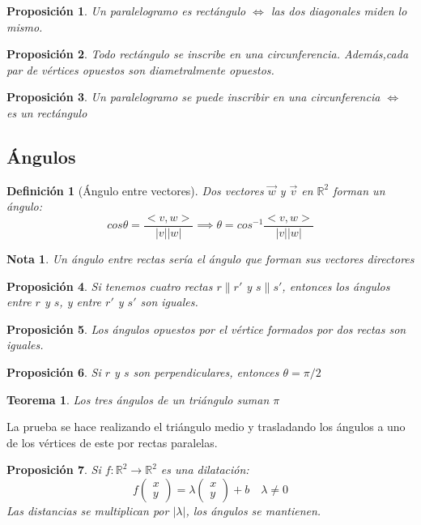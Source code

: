 \documentclass[11pt, a4paper, titlepage]{article}
\makeatletter
\renewenvironment{proof}[1][\proofname] {\vspace{-15pt}\par\pushQED{\qed}\normalfont\topsep6\p@\@plus6\p@\relax\trivlist\item[\hskip\labelsep\it#1\@addpunct{.}]\ignorespaces}{\popQED\endtrivlist\@endpefalse}
\newcommand{\R}{\mathbb{R}}
\theoremstyle{theorem-style}
\newtheorem*{nth}{Teorema}
\newtheorem*{nprop}{Proposición}
\theoremstyle{definition-style}
\newtheorem*{ndef}{Definición}
\theoremstyle{remark-style}
\newtheorem*{nota}{Nota}
\theoremstyle{example-style}
\makeatother
\begin{document}
\begin{nprop}
	Un paralelogramo es rectángulo $\iff$ las dos diagonales miden lo mismo.
\end{nprop}

\begin{nprop}
	Todo rectángulo se inscribe en una circunferencia. Además,cada par de vértices opuestos son diametralmente opuestos.
\end{nprop}

\begin{nprop}
	Un paralelogramo se puede inscribir en una circunferencia $\iff$ es un rectángulo
\end{nprop}

\subsection{Ángulos}

\begin{ndef}[Ángulo entre vectores]
	Dos vectores $\vec{w}$ y $\vec{v}$ en $\R^2$ forman un ángulo:
	\[
	cos \theta =  \frac{< v,w >}{|v||w|} \implies \theta = cos^{-1} \frac{< v,w >}{|v||w|}
	\]
\end{ndef}
\begin{nota}
	Un ángulo entre rectas sería el ángulo que forman sus vectores directores
\end{nota}
\begin{nprop}
	Si tenemos cuatro rectas $r \parallel r'$ y $s \parallel s'$, entonces los ángulos entre $r$ y $s$, y entre $r'$ y $s'$ son iguales.
\end{nprop}

\begin{nprop}
	Los ángulos opuestos por el vértice formados por dos rectas son iguales.
\end{nprop}

\begin{nprop}
	Si $r$ y $s$ son perpendiculares, entonces $\theta = \pi/2$
\end{nprop}

\begin{nth}
	Los tres ángulos de un triángulo suman $\pi$
\end{nth}
\begin{proof}
	La prueba se hace realizando el triángulo medio y trasladando los ángulos a uno de los vértices de este por rectas paralelas.
\end{proof}

\begin{nprop}
	Si $f:\R^2 \to \R^2$ es una dilatación:
	\[
	f \begin{pmatrix}
 x\\
 y 
\end{pmatrix} = \lambda\begin{pmatrix}
 x\\
 y 
\end{pmatrix} + b \quad \lambda \ne 0
	\]
	Las distancias se multiplican por $|\lambda|$, los ángulos se mantienen.
\end{nprop}
\end{document}

